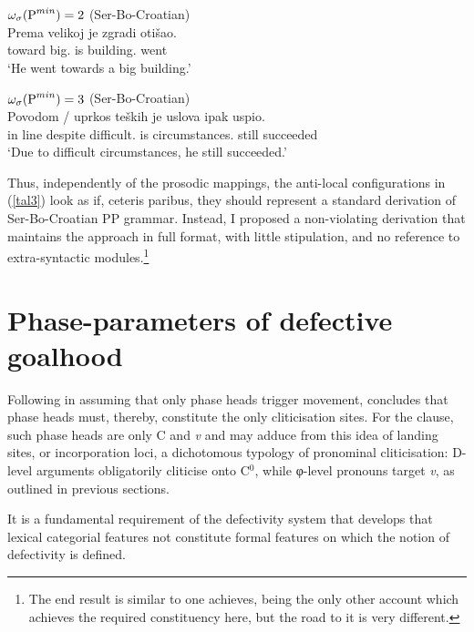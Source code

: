 \documentclass[output=paper]{langsci/langscibook}
\begin{document}
\begin{exe}
    \ex $\omega_\sigma(\textup{P}^{min})=2$
    (Ser-Bo-Croatian)\\
	\gll Prema velikoj je zgradi otišao.\\
	toward big.\Loc{} is building.\Loc{} went\\
	\trans `He went towards a big building.'

	\ex $\omega_\sigma(\textup{P}^{min})=3$
    (Ser-Bo-Croatian)\\
	\gll Povodom / uprkos teških je uslova ipak uspio. \\
        {in line} {} despite difficult.\Gen{} is circumstances.\Gen{} still succeeded \\
	\trans `Due to difficult circumstances, he still succeeded.'
\end{exe}

Thus, independently of the prosodic mappings, the anti-local configurations in
(\ref{tal3}) look as if, ceteris paribus, they should represent a standard
derivation of Ser-Bo-Croatian PP grammar. Instead, I
proposed a non-violating derivation that maintains the approach in full format,
with little stipulation, and no reference to extra-syntactic
modules.\footnote{The end result is similar to one \citet{Boskovic:2005}
    achieves, being the only other account which achieves the required
constituency here, but the road to it is very different.}

\section{Phase-parameters of defective goalhood}
\label{sec:phase}

Following \citet{Chomsky2008} in assuming that only phase heads
trigger movement,  \citet{Roberts2010} concludes that phase heads
must, thereby, constitute the only cliticisation sites. For the
clause, such phase heads are only C and \emph{v} and may adduce from
this idea of landing sites, or incorporation loci, a dichotomous typology of
pronominal cliticisation: D-level arguments obligatorily cliticise
onto C$^0$, while φ-level pronouns target \emph{v}, as outlined in
previous sections.

It is a fundamental requirement of the defectivity system that
\citet{Roberts2010} develops that lexical categorial features not constitute
formal features on which the notion of defectivity is defined.
\end{document}
